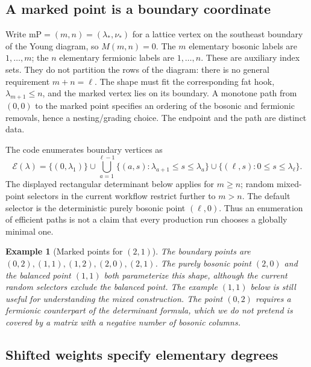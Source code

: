 \documentclass[11pt]{article}
\newtheorem{example}{Example}[section]
\begin{document}
\subsection{A marked point is a boundary coordinate}

Write $\mathrm{mP}=(m,n)=(\lambda_\ast,\nu_\ast)$ for a lattice vertex on
the southeast boundary of the Young diagram, so $M(m,n)=0$.
The $m$ elementary bosonic labels are $1,\ldots,m$; the $n$ elementary
fermionic labels are $1,\ldots,n$. These are auxiliary index sets.
They do not partition the rows of the diagram: there is no general
requirement $m+n=\ell$. The shape must fit the corresponding fat hook,
$\lambda_{m+1}\le n$, and the marked vertex lies on its boundary.
A monotone path from $(0,0)$ to the marked point specifies an ordering
of the bosonic and fermionic removals, hence a nesting/grading choice.
The endpoint and the path are distinct data.

The code enumerates boundary vertices as
\begin{equation}
 \label{eq:boundary-points}
 \mathcal E(\lambda)=\{(0,\lambda_1)\}
 \cup\!\bigcup_{a=1}^{\ell-1}\{(a,s):\lambda_{a+1}\le s\le\lambda_a\}
 \cup\{(\ell,s):0\le s\le\lambda_\ell\}.
\end{equation}
The displayed rectangular determinant below applies for $m\ge n$;
random mixed-point selectors in the current workflow restrict further
to $m>n$. The default selector is the deterministic purely bosonic
point $(\ell,0)$. Thus an enumeration of efficient paths is not a claim
that every production run chooses a globally minimal one.

\begin{example}[Marked points for $(2,1)$]
\label{ex:markedpoints21}
The boundary points are $(0,2),(1,1),(1,2),(2,0),(2,1)$.
The purely bosonic point $(2,0)$ and the balanced point $(1,1)$ both
parameterize this shape, although the current random selectors exclude
the balanced point. The example $(1,1)$ below is still useful for
understanding the mixed construction. The point $(0,2)$ requires a
fermionic counterpart of the determinant formula, which we do not
pretend is covered by a matrix with a negative number of bosonic columns.
\end{example}

\subsection{Shifted weights specify elementary degrees}
\end{document}
